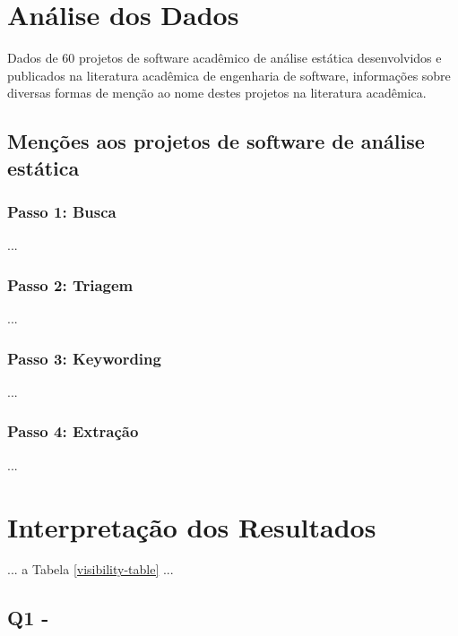 \section{Análise dos Dados} %

Dados de 60 projetos de software acadêmico de análise estática desenvolvidos e
publicados na literatura acadêmica de engenharia de software, informações sobre
diversas formas de menção ao nome destes projetos na literatura acadêmica.

\subsection{Menções aos projetos de software de análise estática}

\subsubsection{Passo 1: Busca}

...

\subsubsection{Passo 2: Triagem}

...

\subsubsection{Passo 3: Keywording}

...

\subsubsection{Passo 4: Extração}

...

\section{Interpretação dos Resultados} %

... a Tabela \ref{visibility-table} ...

%

\subsection{Q1 - \EstudoDoisQuestaoUm}

